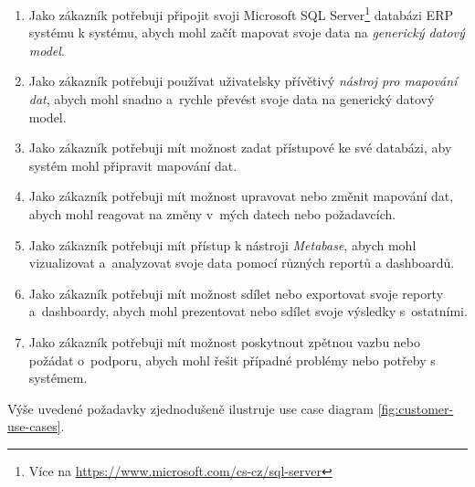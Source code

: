 \begin{enumerate}
    \item Jako zákazník potřebuji připojit svoji Microsoft SQL Server\footnote{Více na \url{https://www.microsoft.com/cs-cz/sql-server}} databázi ERP systému k systému, abych mohl začít mapovat svoje data na \textit{generický datový model}.
    \item Jako zákazník potřebuji používat uživatelsky přívětivý \textit{nástroj pro mapování dat}, abych mohl snadno a~rychle převést svoje data na generický datový model.
    \item Jako zákazník potřebuji mít možnost zadat přístupové ke své databázi, aby systém mohl připravit mapování dat.
    \item Jako zákazník potřebuji mít možnost upravovat nebo změnit mapování dat, abych mohl reagovat na změny v~mých datech nebo požadavcích.
    \item Jako zákazník potřebuji mít přístup k nástroji \textit{Metabase}, abych mohl vizualizovat a~analyzovat svoje data pomocí různých reportů a dashboardů.
    \item Jako zákazník potřebuji mít možnost sdílet nebo exportovat svoje reporty a~dashboardy, abych mohl prezentovat nebo sdílet svoje výsledky s~ostatními.
    \item Jako zákazník potřebuji mít možnost poskytnout zpětnou vazbu nebo požádat o~podporu, abych mohl řešit případné problémy nebo potřeby s systémem.
\end{enumerate}

Výše uvedené požadavky zjednodušeně ilustruje use case diagram \ref{fig:customer-use-cases}.

